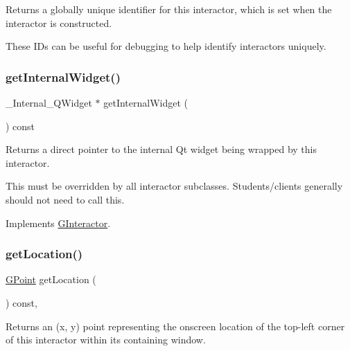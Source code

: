 Returns a globally unique identifier for this interactor, which is set when the interactor is constructed. 

These I\+Ds can be useful for debugging to help identify interactors uniquely. \mbox{\label{classGButton_a208ce13c1da40bf0ddb509daf99d6588}} 
\subsubsection{\texorpdfstring{get\+Internal\+Widget()}{getInternalWidget()}}
{\footnotesize\ttfamily \+\_\+\+Internal\+\_\+\+Q\+Widget $\ast$ get\+Internal\+Widget (\begin{DoxyParamCaption}{ }\end{DoxyParamCaption}) const\hspace{0.3cm}{\ttfamily [virtual]}}



Returns a direct pointer to the internal Qt widget being wrapped by this interactor. 

This must be overridden by all interactor subclasses. Students/clients generally should not need to call this. 

Implements \mbox{\hyperlink{classGInteractor}{G\+Interactor}}.

\mbox{\label{classGInteractor_a4f83802015511edeb63b892830812c11}} 
\subsubsection{\texorpdfstring{get\+Location()}{getLocation()}}
{\footnotesize\ttfamily \mbox{\hyperlink{classGPoint}{G\+Point}} get\+Location (\begin{DoxyParamCaption}{ }\end{DoxyParamCaption}) const\hspace{0.3cm}{\ttfamily [virtual]}, {\ttfamily [inherited]}}



Returns an (x, y) point representing the onscreen location of the top-\/left corner of this interactor within its containing window. 

\mbox{\label{classGInteractor_aed4b0075fcc434499c3cb3e46896bda3}} 
